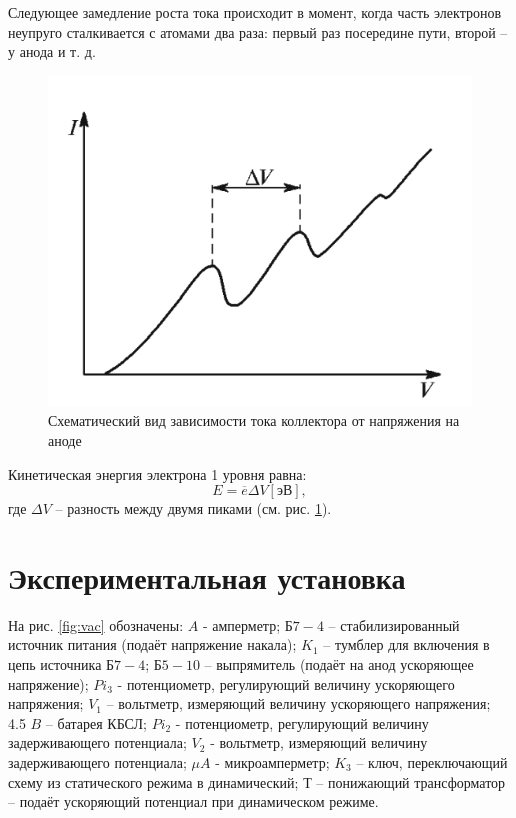    Следующее замедление роста тока происходит в момент, когда часть электронов неупруго сталкивается с атомами два раза: первый раз посередине пути, второй -- у анода и т. д.

    \begin{figure}[h!]
        \centering
        \includegraphics[width = 9 cm]{images/exp_IU_dep}
        \caption{Схематический вид зависимости тока коллектора от напряжения на аноде}
        \label{ris:experimcoded}
    \end{figure}

    Кинетическая энергия электрона 1 уровня равна:
    \begin{equation}
        \label{key}
        E = \overline{e} \Delta V \left[\text{эВ}\right],
    \end{equation}
    где $\Delta V$ -- разность между двумя пиками (см. рис. \ref{ris:experimcoded}).
   
\section{Экспериментальная установка}

    На рис. \ref{fig:vac} обозначены: $A$ - амперметр; $\text{Б}7-4$ -- стабилизированный источник питания (подаёт напряжение накала); $K_1$ -- тумблер для включения в цепь источника $\text{Б}7-4$; $\text{Б}5-10$ -- выпрямитель (подаёт на анод ускоряющее напряжение); $Pi_3$ - потенциометр, регулирующий величину ускоряющего напряжения; $V_1$ -- вольтметр, измеряющий величину ускоряющего напряжения; 4.5 $B$ -- батарея КБСЛ; $Pi_2$ - потенциометр, регулирующий величину задерживающего потенциала; $V_2$ - вольтметр, измеряющий величину задерживающего потенциала; $\mu A$ - микроамперметр; $K_3$ -- ключ, переключающий схему из статического режима в динамический; Т -- понижающий трансформатор -- подаёт ускоряющий потенциал при динамическом режиме.


